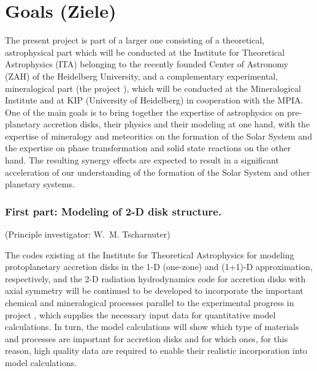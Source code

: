 \section{Goals (Ziele)}
%
The present project is part of a larger one consisting of a
theoretical, astrophysical part which will be conducted at the
Institute for Theoretical Astrophysics (ITA) belonging to the
recently founded Center of Astronomy (ZAH) of the Heidelberg
University, and a complementary experimental, mineralogical part (the project
\projlattard), which will be conducted at the Mineralogical
Institute and at KIP (University of Heidelberg) in cooperation
with the MPIA. One of the main goals is to bring together the
expertise of astrophysics on pre-planetary accretion disks, their
physics and their modeling at one hand, with the expertise of
mineralogy and meteoritics on the formation of the Solar System
and the expertise on phase transformation and solid state
reactions on the other hand. The resulting synergy effects are
expected to result in a significant acceleration of our
understanding of the formation of the Solar System and other
planetary systems.

\subsubsection{First part: Modeling of 2-D disk structure.} (Principle
investigator: W.~M. Tscharnuter)

\noindent The codes existing at the Institute for Theoretical Astrophysics
for modeling protoplanetary accretion disks in the 1-D (one-zone)
and (1+1)-D approximation, respectively, and the 2-D radiation
hydrodynamics code for accretion disks with axial symmetry will be
continued to be developed to incorporate the important chemical
and mineralogical processes parallel to the experimental progress
in project \projlattard, which supplies the necessary input data
for quantitative model calculations. In turn, the model
calculations will show which type of materials and processes are
important for accretion disks and for which ones, for this reason,
high quality data are required to enable their realistic
incorporation into model calculations.

